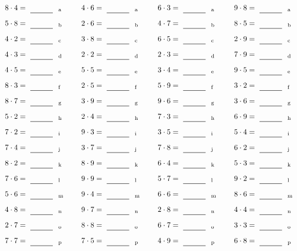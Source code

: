 \documentclass
[
  draft    = true,
  fontsize = 11pt,
  parskip  = half-
]
{scrartcl}
\begin{document}
\par\vfill\par
\begin{align*}
    \pline{8\cdot4}&=\rline{a}
  & \pline{4\cdot6}&=\rline{a}
  & \pline{6\cdot3}&=\rline{a}
  & \pline{9\cdot8}&=\rline{a} \\[1ex]
    \pline{5\cdot8}&=\rline{b}
  & \pline{2\cdot6}&=\rline{b}
  & \pline{4\cdot7}&=\rline{b}
  & \pline{8\cdot5}&=\rline{b} \\[1ex]
    \pline{4\cdot2}&=\rline{c}
  & \pline{3\cdot8}&=\rline{c}
  & \pline{6\cdot5}&=\rline{c}
  & \pline{2\cdot9}&=\rline{c} \\[1ex]
    \pline{4\cdot3}&=\rline{d}
  & \pline{2\cdot2}&=\rline{d}
  & \pline{2\cdot3}&=\rline{d}
  & \pline{7\cdot9}&=\rline{d} \\[1ex]
    \pline{4\cdot5}&=\rline{e}
  & \pline{5\cdot5}&=\rline{e}
  & \pline{3\cdot4}&=\rline{e}
  & \pline{9\cdot5}&=\rline{e} \\[1ex]
    \pline{8\cdot3}&=\rline{f}
  & \pline{2\cdot5}&=\rline{f}
  & \pline{5\cdot9}&=\rline{f}
  & \pline{3\cdot2}&=\rline{f} \\[1ex]
    \pline{8\cdot7}&=\rline{g}
  & \pline{3\cdot9}&=\rline{g}
  & \pline{9\cdot6}&=\rline{g}
  & \pline{3\cdot6}&=\rline{g} \\[1ex]
    \pline{5\cdot2}&=\rline{h}
  & \pline{2\cdot4}&=\rline{h}
  & \pline{7\cdot3}&=\rline{h}
  & \pline{6\cdot9}&=\rline{h} \\[1ex]
    \pline{7\cdot2}&=\rline{i}
  & \pline{9\cdot3}&=\rline{i}
  & \pline{3\cdot5}&=\rline{i}
  & \pline{5\cdot4}&=\rline{i} \\[1ex]
    \pline{7\cdot4}&=\rline{j}
  & \pline{3\cdot7}&=\rline{j}
  & \pline{7\cdot8}&=\rline{j}
  & \pline{6\cdot2}&=\rline{j} \\[1ex]
    \pline{8\cdot2}&=\rline{k}
  & \pline{8\cdot9}&=\rline{k}
  & \pline{6\cdot4}&=\rline{k}
  & \pline{5\cdot3}&=\rline{k} \\[1ex]
    \pline{7\cdot6}&=\rline{l}
  & \pline{9\cdot9}&=\rline{l}
  & \pline{5\cdot7}&=\rline{l}
  & \pline{9\cdot2}&=\rline{l} \\[1ex]
    \pline{5\cdot6}&=\rline{m}
  & \pline{9\cdot4}&=\rline{m}
  & \pline{6\cdot6}&=\rline{m}
  & \pline{8\cdot6}&=\rline{m} \\[1ex]
    \pline{4\cdot8}&=\rline{n}
  & \pline{9\cdot7}&=\rline{n}
  & \pline{2\cdot8}&=\rline{n}
  & \pline{4\cdot4}&=\rline{n} \\[1ex]
    \pline{2\cdot7}&=\rline{o}
  & \pline{8\cdot8}&=\rline{o}
  & \pline{6\cdot7}&=\rline{o}
  & \pline{3\cdot3}&=\rline{o} \\[1ex]
    \pline{7\cdot7}&=\rline{p}
  & \pline{7\cdot5}&=\rline{p}
  & \pline{4\cdot9}&=\rline{p}
  & \pline{6\cdot8}&=\rline{p}
\end{align*}
\end{document}
